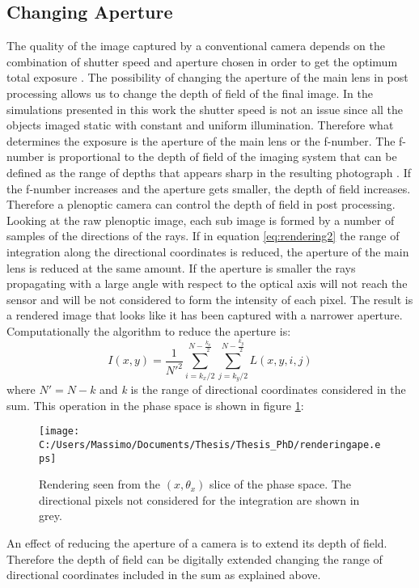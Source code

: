 \subsection{Changing Aperture}
The quality of the image captured by a conventional camera depends on the combination of shutter speed and aperture chosen in order to get the optimum total exposure \cite{pedrotti1993introduction}.
 The possibility of changing the aperture of the main lens in post processing allows us to change the depth of field of the final image. In the simulations presented in this work the shutter speed is not an issue since all the objects imaged static with constant and uniform illumination. Therefore what determines the exposure is the aperture of the main lens or the f-number. The f-number is proportional to the depth of field of the imaging system that can be defined as the range of depths that appears sharp in the resulting photograph \cite{ng2006digital}. If the f-number increases and the aperture gets smaller, the depth of field increases. Therefore a plenoptic camera can control the depth of field in post processing.
 Looking at the raw plenoptic image, each sub image is formed by a number of samples of the directions of the rays. If in equation \ref{eq:rendering2} the range of integration along the directional coordinates is reduced, the aperture of the main lens is reduced at the same amount. If the aperture is smaller the rays propagating with a large angle with respect to the optical axis will not reach the sensor and will be not considered to form the intensity of each pixel. The result is a rendered image that looks like it has been captured with a narrower aperture. Computationally the algorithm to reduce the aperture is:
 \begin{equation}
 	\label{eq:rendering4}
 	I(x,y) = \dfrac{1}{N'^2}\sum_{i=k_x/2}^{N-\frac{k_x}{2}}\sum_{j=k_{y}/2}^{N-\frac{k_y}{2}} L(x,y,i,j)
 \end{equation}
 where $N'=N-k$ and \textit{k} is the range of directional coordinates considered in the sum. This operation in the phase space is shown in figure \ref{fig:rendering4}:
 \begin{figure}[H]
 	\centering
 	\texttt{[image: C:/Users/Massimo/Documents/Thesis/Thesis\_PhD/renderingape.eps]}
 	\caption{\label{fig:rendering4} Rendering seen from the $(x,\theta_x)$ slice of the phase space. The directional pixels not considered for the integration are shown in grey. }
 \end{figure}
An effect of reducing the aperture of a camera is to extend its depth of field. Therefore the depth of field can be digitally extended changing the range of directional coordinates included in the sum as explained above.
